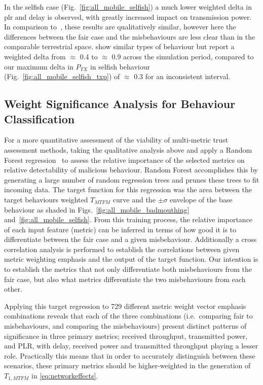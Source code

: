 In the selfish case (Fig.~\ref{fig:all_mobile_selfish}) a much lower weighted delta in \gls{plr} and delay is observed, with greatly increased impact on transmission power.
In comparison to~\cite{Guo11}, these results are qualitatively similar, however here the differences between the fair case and the misbehaviours are less clear than in the comparable terrestrial space.
\citet{Guo11} show similar types of behaviour but report a weighted delta from $\approx$ 0.4 to $\approx$ 0.9 across the simulation period, compared to our maximum delta in $P_{TX}$ in selfish behaviour (Fig.~\ref{fig:all_mobile_selfish_txp}) of $\approx$ 0.3 for an inconsistent interval.

\subsection{Weight Significance Analysis for Behaviour Classification}

For a more quantitative assessment of the viability of multi-metric trust assessment methods, taking the qualitative analysis above and apply a Random Forest regression~\cite{Breiman2001} to assess the relative importance of the selected metrics on relative detectability of malicious behaviour. 
Random Forest accomplishes this by generating a large number of random regression trees and prunes these trees to fit incoming data.
The target function for this regression was the area between the target behaviours weighted $T_{MTFM}$ curve and the $\pm\sigma$ envelope of the base behaviour as shaded in Figs.~\ref{fig:all_mobile_badmouthing} and~\ref{fig:all_mobile_selfish}.
From this training process, the relative importance of each input feature (metric) can be inferred in terms of how good it is to differentiate between the fair case and a given misbehaviour.
Additionally a cross correlation analysis is performed to establish the correlations between given metric weighting emphasis and the output of the target function.
Our intention is to establish the metrics that not only differentiate both misbehaviours from the fair case, but also what metrics differentiate the two misbehaviours from each other.

Applying this target regression to 729 different metric weight vector emphasis combinations reveals that each of the three combinations (i.e.\ comparing fair to misbehaviours, and comparing the misbehaviours) present distinct patterns of significance in three primary metrics; received throughput, transmitted power, and PLR, with delay, received power and transmitted throughput playing a lesser role.
Practically this means that in order to accurately distinguish between these scenarios, these primary metrics should be higher-weighted in the generation of $T_{1,MTFM}$ in \autoref{eq:networkeffects}.

